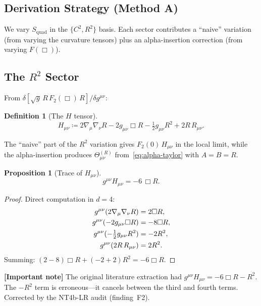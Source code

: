 \documentclass[11pt,a4paper]{article}
\theoremstyle{plain}
\newtheorem{proposition}[theorem]{Proposition}
\theoremstyle{definition}
\newtheorem{definition}[theorem]{Definition}
\newcommand{\signcorrection}[1]{%
  \par\smallskip\noindent
  \colorbox{red!10}{\parbox{\dimexpr\linewidth-2\fboxsep}{%
    \textcolor{red!60!black}{\textbf{[Important note]}} #1}}%
  \par\smallskip}
\begin{document}
\subsection{Derivation Strategy (Method A)}

We vary $S_{\mathrm{quad}}$ in the $\{C^2, R^2\}$ basis. Each sector
contributes a ``naive'' variation (from varying the curvature tensors)
plus an alpha-insertion correction (from varying $F(\Box)$).

\subsection{The $R^2$ Sector}

From $\delta[\sqrt{g}\,R\,F_2(\Box)\,R]/\delta g^{\mu\nu}$:

\begin{definition}[The $H$ tensor]\label{def:H}
\begin{equation}\label{eq:H-tensor}
  H_{\mu\nu} \coloneqq 2\nabla_\mu\nabla_\nu R
  - 2g_{\mu\nu}\Box R
  - \tfrac{1}{2}g_{\mu\nu}R^2
  + 2R\,R_{\mu\nu}.
\end{equation}
\end{definition}

The ``naive'' part of the $R^2$ variation gives $F_2(0)\,H_{\mu\nu}$ in
the local limit, while the alpha-insertion produces $\Theta^{(R)}_{\mu\nu}$
from~\eqref{eq:alpha-taylor} with $A = B = R$.

\begin{proposition}[Trace of $H_{\mu\nu}$]\label{prop:H-trace}
\begin{equation}\label{eq:H-trace}
  g^{\mu\nu}H_{\mu\nu} = -6\,\Box R.
\end{equation}
\end{proposition}

\begin{proof}
Direct computation in $d = 4$:
\begin{align}
  g^{\mu\nu}(2\nabla_\mu\nabla_\nu R) &= 2\Box R, \notag\\
  g^{\mu\nu}(-2g_{\mu\nu}\Box R) &= -8\Box R, \notag\\
  g^{\mu\nu}(-\tfrac{1}{2}g_{\mu\nu}R^2) &= -2R^2, \notag\\
  g^{\mu\nu}(2R\,R_{\mu\nu}) &= 2R^2.
\end{align}
Summing: $(2-8)\Box R + (-2+2)R^2 = -6\Box R$.
\end{proof}

\signcorrection{The original literature extraction had
$g^{\mu\nu}H_{\mu\nu} = -6\Box R - R^2$. The $-R^2$ term is
erroneous---it cancels between the third and fourth terms. Corrected
by the NT4b-LR audit (finding~F2).}
\end{document}
